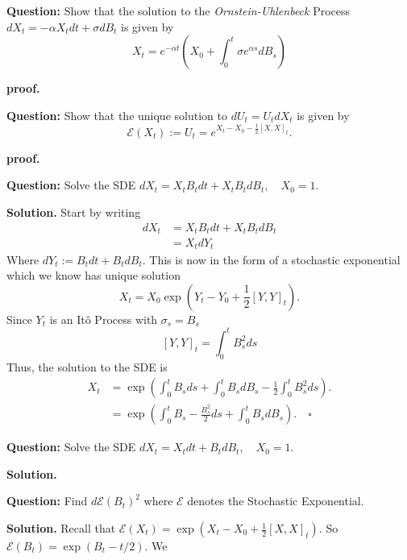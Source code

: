 \documentclass{article}
\begin{document}
\begin{tcolorbox}[colframe=black,colback=gray!5,boxrule=0.5pt]
\textbf{Question:} Show that the solution to the \textit{Ornstein-Uhlenbeck} Process $dX_t = -\alpha X_tdt + \sigma dB_t$ is given by 
$$X_t = e^{-\alpha t}\left(X_0 + \int_0^t\sigma e^{\alpha s}dB_s\right)$$
\end{tcolorbox}
\textbf{proof.}

\begin{tcolorbox}[colframe=black,colback=gray!5,boxrule=0.5pt]
\textbf{Question:} Show that the unique solution to $dU_t = U_tdX_t$ is given by 
$$\mathcal{E}(X_t) := U_t = e^{X_t - X_0 - \frac{1}{2}[X,X]_t}.$$
\end{tcolorbox}
\textbf{proof.}

\begin{tcolorbox}[colframe=black,colback=gray!5,boxrule=0.5pt]
\textbf{Question:} Solve the SDE $dX_t = X_tB_tdt + X_tB_tdB_t, \quad X_0=1$.
\end{tcolorbox}
\textbf{Solution.} Start by writing
\begin{align*}
    dX_t &= X_tB_tdt + X_tB_tdB_t \\
    &= X_tdY_t
\end{align*}
Where $dY_t := B_tdt + B_tdB_t$. This is now in the form of a stochastic exponential which we know has unique solution
$$X_t = X_0\exp\left(Y_t - Y_0 + \frac{1}{2}[Y,Y]_t\right).$$
Since $Y_t$ is an Itô Process with $\sigma_s = B_s$
$$[Y,Y]_t = \int_0^t B_s^2 ds$$
Thus, the solution to the SDE is 
\begin{align*}
    X_t &= \exp\left( \int_0^tB_sds + \int_0^t B_sdB_s - \frac{1}{2}\int_0^t B_s^2ds\right). \\
    &= \exp\left( \int_0^tB_s - \frac{B_s^2}{2}ds + \int_0^t B_sdB_s \right). \quad \square
\end{align*}

\begin{tcolorbox}[colframe=black,colback=gray!5,boxrule=0.5pt]
\textbf{Question:} Solve the SDE $dX_t = X_t dt + B_tdB_t, \quad X_0=1$.
\end{tcolorbox}
\textbf{Solution.} 


\begin{tcolorbox}[colframe=black,colback=gray!5,boxrule=0.5pt]
\textbf{Question:} Find $d\mathcal{E}(B_t)^2$ where $\mathcal{E}$ denotes the Stochastic Exponential.
\end{tcolorbox}
\textbf{Solution.} Recall that $\mathcal{E}(X_t) = \exp(X_t - X_0 + \frac{1}{2}[X,X]_t)$. So $\mathcal{E}(B_t) = \exp(B_t - t/2).$ We 
\end{document}
